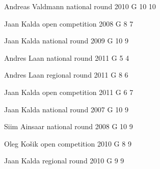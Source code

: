 \documentclass[11pt]{article}
\begin{document}
\ylDisplay{} %
{Andreas Valdmann} %
{national round} %
{2010} %
{G 10} %
{10} %
{

\ifEngSolution
\fi
}

\ylDisplay{} %
{Jaan Kalda} %
{open competition} %
{2008} %
{G 8} %
{7} %
{

\ifEngSolution
\fi
}

\ylDisplay{} %
{Jaan Kalda} %
{national round} %
{2009} %
{G 10} %
{9} %
{

\ifEngSolution
\fi
}

\ylDisplay{} %
{Andres Laan} %
{national round} %
{2011} %
{G 5} %
{4} %
{

\ifEngSolution
\fi
}

\ylDisplay{} %
{Andres Laan} %
{regional round} %
{2011} %
{G 8} %
{6} %
{

\ifEngSolution
\fi
}

\ylDisplay{} %
{Jaan Kalda} %
{open competition} %
{2011} %
{G 6} %
{7} %
{

\ifEngSolution
\fi
}

\ylDisplay{} %
{Jaan Kalda} %
{national round} %
{2007} %
{G 10} %
{9} %
{

\ifEngSolution
\fi
}

\ylDisplay{} %
{Siim Ainsaar} %
{national round} %
{2008} %
{G 10} %
{9} %
{

\ifEngSolution
\fi
}

\ylDisplay{} %
{Oleg Košik} %
{open competition} %
{2010} %
{G 8} %
{9} %
{

\ifEngSolution
\fi
}

\ylDisplay{} %
{Jaan Kalda} %
{regional round} %
{2010} %
{G 9} %
{9} %
{

\ifEngSolution
\fi
}
\end{document}
